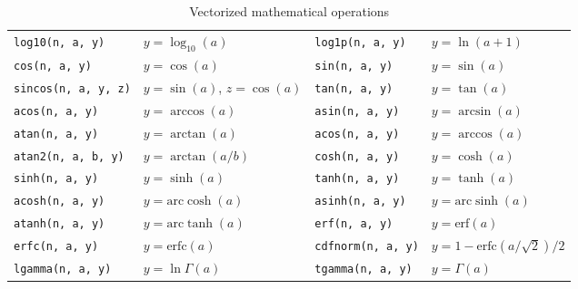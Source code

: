 \begin{table}[t]
\begin{tabu}{X[l]X[l]X[l]X[l]}
    \texttt{log10(n, a, y)}     & $y = \log_{10}(a)$                        &
    \texttt{log1p(n, a, y)}     & $y = \ln(a + 1)$                          \\
    \texttt{cos(n, a, y)}       & $y = \cos(a)$                             &
    \texttt{sin(n, a, y)}       & $y = \sin(a)$                             \\
    \texttt{sincos(n, a, y, z)} & $y = \sin(a)$, $z = \cos(a)$              &
    \texttt{tan(n, a, y)}       & $y = \tan(a)$                             \\
    \texttt{acos(n, a, y)}      & $y = \arccos(a)$                          &
    \texttt{asin(n, a, y)}      & $y = \arcsin(a)$                          \\
    \texttt{atan(n, a, y)}      & $y = \arctan(a)$                          &
    \texttt{acos(n, a, y)}      & $y = \arccos(a)$                          \\
    \texttt{atan2(n, a, b, y)}  & $y = \arctan(a / b)$                      &
    \texttt{cosh(n, a, y)}      & $y = \cosh(a)$                            \\
    \texttt{sinh(n, a, y)}      & $y = \sinh(a)$                            &
    \texttt{tanh(n, a, y)}      & $y = \tanh(a)$                            \\
    \texttt{acosh(n, a, y)}     & $y = \mathrm{arc}\cosh(a)$                &
    \texttt{asinh(n, a, y)}     & $y = \mathrm{arc}\sinh(a)$                \\
    \texttt{atanh(n, a, y)}     & $y = \mathrm{arc}\tanh(a)$                &
    \texttt{erf(n, a, y)}       & $y = \mathrm{erf}(a)$                     \\
    \texttt{erfc(n, a, y)}      & $y = \mathrm{erfc}(a)$                    &
    \texttt{cdfnorm(n, a, y)}   & $y = 1 - \mathrm{erfc}(a / \sqrt{2}) / 2$ \\
    \texttt{lgamma(n, a, y)}    & $y = \ln\Gamma(a)$                        &
    \texttt{tgamma(n, a, y)}    & $y = \Gamma(a)$                           \\
    \bottomrule
  \end{tabu}
  \caption{Vectorized mathematical operations}
  \label{tab:Vectorized mathematical operations}
\end{table}

